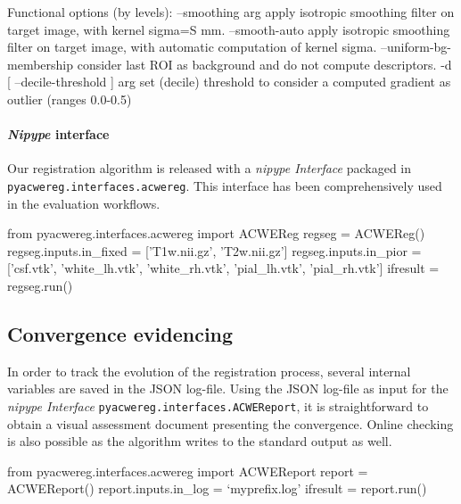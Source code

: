 \documentclass[a4paper]{report}
\begin{document}
\begin{bashcode}
Functional options (by levels):
  --smoothing arg               apply isotropic smoothing filter on target
                                image, with kernel sigma=S mm.
  --smooth-auto                 apply isotropic smoothing filter on target
                                image, with automatic computation of kernel
                                sigma.
  --uniform-bg-membership       consider last ROI as background and do not
                                compute descriptors.
  -d [ --decile-threshold ] arg set (decile) threshold to consider a computed
                                gradient as outlier (ranges 0.0-0.5)

\end{bashcode}

\paragraph{\emph{Nipype} interface}
Our registration algorithm is released with a \emph{nipype Interface} packaged in
  \lstinline!pyacwereg.interfaces.acwereg!.
This interface has been comprehensively used in the evaluation workflows.

\begin{pythoncode}
from pyacwereg.interfaces.acwereg import ACWEReg
regseg = ACWEReg()
regseg.inputs.in_fixed = ['T1w.nii.gz', 'T2w.nii.gz']
regseg.inputs.in_pior = ['csf.vtk', 'white_lh.vtk', 'white_rh.vtk',
                         'pial_lh.vtk', 'pial_rh.vtk']
ifresult = regseg.run()
\end{pythoncode}



\subsection{Convergence evidencing}\label{sec:convergence_evidence}
In order to track the evolution of the registration process, several internal variables
  are saved in the JSON log-file.
Using the JSON log-file as input for the \emph{nipype Interface}
  \lstinline!pyacwereg.interfaces.ACWEReport!, it is straightforward to obtain
  a visual assessment document presenting the convergence.
Online checking is also possible as the algorithm writes to the standard output as well.

\begin{pythoncode}
from pyacwereg.interfaces.acwereg import ACWEReport
report = ACWEReport()
report.inputs.in_log = `myprefix.log'
ifresult = report.run()
\end{pythoncode}
\end{document}
